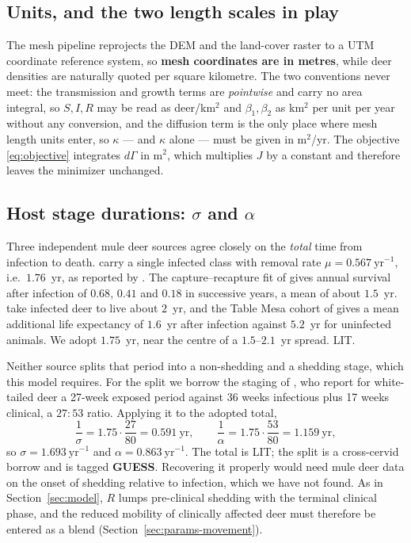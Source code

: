 \documentclass[11pt]{article}
\newcommand{\tagLIT}{{\footnotesize\textsf{\textcolor{green!40!black}{LIT}}}}
\newcommand{\tagGUESS}{{\footnotesize\textsf{\textbf{\textcolor{red!70!black}{GUESS}}}}}
\begin{document}
\subsection{Units, and the two length scales in play}
\label{sec:params-units}

The mesh pipeline reprojects the DEM and the land-cover raster to a UTM coordinate reference system, so \textbf{mesh coordinates are in metres}, while deer densities are naturally quoted per square kilometre. The two conventions never meet: the transmission and growth terms are \emph{pointwise} and carry no area integral, so $S,I,R$ may be read as deer/km$^2$ and $\beta_1,\beta_2$ as km$^2$ per unit per year without any conversion, and the diffusion term is the only place where mesh length units enter, so $\kappa$ --- and $\kappa$ alone --- must be given in m$^2$/yr. The objective \eqref{eq:objective} integrates $d\Gamma$ in m$^2$, which multiplies $J$ by a constant and therefore leaves the minimizer unchanged.

\subsection{Host stage durations: $\sigma$ and $\alpha$}
\label{sec:params-stages}

Three independent mule deer sources agree closely on the \emph{total} time from infection to death. \citet{Miller2006} carry a single infected class with removal rate $\mu = 0.567\ \mathrm{yr}^{-1}$, i.e.\ $1.76$~yr, as reported by \citet{SharpPastor2011}. The capture--recapture fit of \citet{Geremia2015} gives annual survival after infection of $0.68$, $0.41$ and $0.18$ in successive years, a mean of about $1.5$~yr. \citet{Potapov2016} take infected deer to live about $2$~yr, and the Table Mesa cohort of \citet{Miller2008} gives a mean additional life expectancy of $1.6$~yr after infection against $5.2$~yr for uninfected animals. We adopt $1.75$~yr, near the centre of a $1.5$--$2.1$~yr spread. \tagLIT{}.

Neither source splits that period into a non-shedding and a shedding stage, which this model requires. For the split we borrow the staging of \citet{Almberg2011}, who report for white-tailed deer a 27-week exposed period against 36 weeks infectious plus 17 weeks clinical, a $27\!:\!53$ ratio. Applying it to the adopted total,
\[
\frac{1}{\sigma} = 1.75\cdot\frac{27}{80} = 0.591\ \mathrm{yr},
\qquad
\frac{1}{\alpha} = 1.75\cdot\frac{53}{80} = 1.159\ \mathrm{yr},
\]
so $\sigma = 1.693\ \mathrm{yr}^{-1}$ and $\alpha = 0.863\ \mathrm{yr}^{-1}$. The total is \tagLIT{}; the split is a cross-cervid borrow and is tagged \tagGUESS{}. Recovering it properly would need mule deer data on the onset of shedding relative to infection, which we have not found. As in Section~\ref{sec:model}, $R$ lumps pre-clinical shedding with the terminal clinical phase, and the reduced mobility of clinically affected deer must therefore be entered as a blend (Section~\ref{sec:params-movement}).
\end{document}
